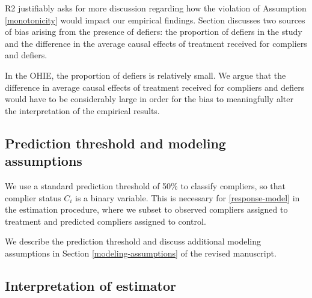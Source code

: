 \documentclass[hidelinks,12pt,letterpaper]{article}
\begin{document}

R2 justifiably asks for more discussion regarding how the violation of Assumption \ref{monotonicity} would impact our empirical findings. Section \label{sens-defiers} discusses two sources of bias arising from the presence of defiers: the proportion of defiers in the study and the difference in the average causal effects of treatment received for compliers and defiers. 

In the OHIE, the proportion of defiers is relatively small. We argue that the difference in average causal effects of treatment received for compliers and defiers would have to be considerably large in order for the bias to meaningfully alter the interpretation of the empirical results. 

\subsection{Prediction threshold and modeling assumptions}\label{prediction-threshold}


We use a standard prediction threshold of 50\% to classify compliers, so that complier status $C_i$ is a binary variable. This is necessary for \ref{response-model} in the estimation procedure, where we subset to observed compliers assigned to treatment and predicted compliers assigned to control. 

We describe the prediction threshold and discuss additional modeling assumptions in Section \ref{modeling-assumptions} of the revised manuscript. 

\subsection{Interpretation of estimator}\label{interpret}
\end{document}
